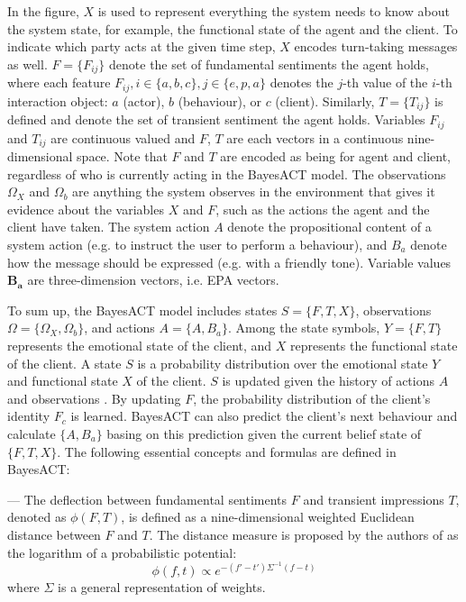 In the figure, $X$ is used to represent everything the system needs to know about the system state, for example, the functional state of the agent and the client. To indicate which party acts at the given time step, $X$ encodes turn-taking messages as well. $F = \{F_{ij}\}$ denote the set of fundamental sentiments the agent holds, where each feature $F_{ij}, i \in \{a, b, c\}, j \in \{e, p, a\}$ denotes the $j$-th value of the $i$-th interaction object: $a$ (actor), $b$ (behaviour), or $c$ (client). Similarly, $T = \{T_{ij}\}$ is defined and denote the set of transient sentiment the agent holds. Variables $F_{ij}$ and $T_{ij}$ are continuous valued and $F$, $T$ are each vectors in a continuous nine-dimensional space. Note that $F$ and $T$ are encoded as being for agent and client, regardless of who is currently acting in the BayesACT model. The observations $\Omega_{X}$ and $\Omega_{b}$ are anything the system observes in the environment that gives it evidence about the variables $X$ and $F$, such as the actions the agent and the client have taken. The system action $A$ denote the propositional content of a system action (e.g. to instruct the user to perform a behaviour), and $B_{a}$ denote how the message should be expressed (e.g. with a friendly tone). Variable values $\mathbf{B_{a}}$ are three-dimension vectors, i.e. EPA vectors.

To sum up, the BayesACT model includes states $S = \{F, T, X\}$, observations $\Omega = \{\Omega_{X}, \Omega_{b}\}$, and actions $A = \{A, B_{a}\}$. Among the state symbols, $Y = \{F, T\}$ represents the emotional state of the client, and $X$ represents the functional state of the client. A state $S$ is a probability distribution over the emotional state $Y$ and functional state $X$ of the client. $S$ is updated given the history of actions $A$ and observations . By updating $F$, the probability distribution of the client's identity $F_{c}$ is learned. BayesACT can also predict the client's next behaviour and calculate $\{A, B_{a}\}$ basing on this prediction given the current belief state of $\{F, T, X\}$. The following essential concepts and formulas are defined in BayesACT:

--- The deflection between fundamental sentiments $F$ and transient impressions $T$, denoted as  $\phi(F, T)$, is defined as a nine-dimensional weighted Euclidean distance between $F$ and $T$. The distance measure is proposed by the authors of \cite{hoey2013bayesian} as the logarithm of a probabilistic potential: 
\begin{equation}\label{eq:eq_deflection}
\phi(f,t) \propto e^{-(f'-t')\Sigma^{-1}(f-t)}
\end{equation}
where $\Sigma$ is a general representation of weights. 

